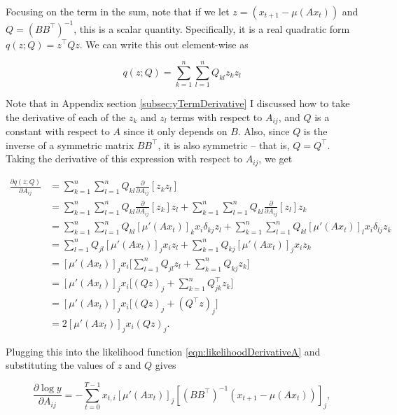 \documentclass[12pt]{article}
\theoremstyle{definition}
\begin{document}
Focusing on the term in the sum, note that if we let $z = (x_{t+1} - \mu(Ax_t))$ and $Q = (BB^\top)^{-1}$, this is a scalar quantity. Specifically, it is a real quadratic form $q(z; Q) = z^\top Q z$. We can write this out element-wise as

\[
q(z; Q) = \sum_{k=1}^{n} \sum_{l=1}^{n} Q_{kl} z_k z_l
\]

Note that in Appendix section \ref{subsec:yTermDerivative} I discussed how to take the derivative of each of the $z_k$ and $z_l$ terms with respect to $A_{ij}$, and $Q$ is a constant with respect to $A$ since it only depends on $B$. Also, since $Q$ is the inverse of a symmetric matrix $BB^\top$, it is also symmetric -- that is, $Q=Q^\top$. Taking the derivative of this expression with respect to $A_{ij}$, we get

\begin{equation}
    \begin{split}
    \frac{\partial q(z; Q)}{\partial A_{ij}} & = \sum_{k=1}^{n} \sum_{l=1}^{n} Q_{kl} \frac{\partial}{\partial A_{ij}} [z_k z_l] \\
    & = \sum_{k=1}^{n} \sum_{l=1}^{n} Q_{kl} \frac{\partial}{\partial A_{ij}} [z_k] z_l+ \sum_{k=1}^{n} \sum_{l=1}^{n} Q_{kl} \frac{\partial}{\partial A_{ij}} [z_l] z_k \\
    &= \sum_{k=1}^{n} \sum_{l=1}^{n} Q_{kl} [\mu'(Ax_t)]_k x_i \delta_{kj} z_l + \sum_{k=1}^{n} \sum_{l=1}^{n} Q_{kl} [\mu'(Ax_t)]_l x_i \delta_{lj} z_k \\ 
    & = \sum_{l=1}^{n} Q_{jl} [\mu'(Ax_t)]_j x_i z_l + \sum_{k=1}^{n}  Q_{kj} [\mu'(Ax_t)]_j x_i z_k \\ 
    & =  [\mu'(Ax_t)]_j x_i \big[\sum_{l=1}^{n} Q_{jl} z_l +  \sum_{k=1}^{n}  Q_{kj} z_k \big] \\ 
    & = [\mu'(Ax_t)]_j x_i \big[(Qz)_j +  \sum_{k=1}^{n}  Q^\top_{jk} z_k \big] \\ 
    & = [\mu'(Ax_t)]_j x_i \big[(Qz)_j +  (Q^\top z)_j \big] \\ 
    & = 2 [\mu'(Ax_t)]_j x_i (Qz)_j.
\end{split}
\end{equation}

Plugging this into the likelihood function \ref{eqn:likelihoodDerivativeA} and substituting the values of $z$ and $Q$ gives

\begin{equation}
    \label{eqn:gradAElementWise}
    \frac{\partial \log y}{\partial A_{ij}} = - \sum_{t=0}^{T-1} x_{t,i} [\mu'(Ax_t)]_j [(BB^\top)^{-1} (x_{t+1} - \mu(Ax_t))]_j,
\end{equation}
\end{document}
